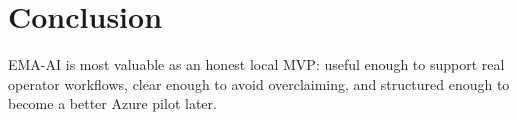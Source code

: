 \documentclass[11pt]{article}
\begin{document}
\section{Conclusion}
EMA-AI is most valuable as an honest local MVP: useful enough to support real operator workflows, clear enough to avoid overclaiming, and structured enough to become a better Azure pilot later.

\nocite{*}


\end{document}
